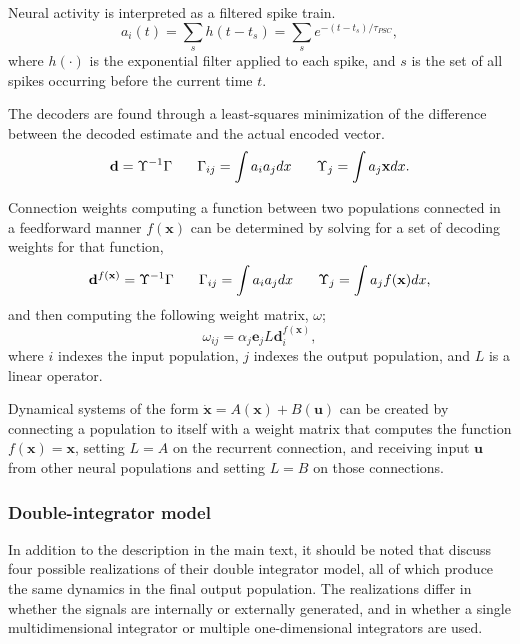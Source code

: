 \documentclass[11pt]{article}
\begin{document}
Neural activity is interpreted as a
filtered spike train.
\begin{equation}
  a_i(t) = \sum_s h(t - t_s) = \sum_s e^{-(t - t_s) / \tau_{PSC}},
\end{equation}
where $h(\cdot)$ is the exponential filter
applied to each spike,
and $s$ is the set of all spikes occurring
before the current time $t$.

The decoders are found through a least-squares minimization
of the difference between the decoded estimate
and the actual encoded vector.
\begin{equation}
  \mathbf{d} = \Upsilon^{-1} \Gamma \hspace{1.8em}
  \Gamma_{ij} = \int a_i a_j dx \hspace{1.8em}
  \Upsilon_j = \int a_j \mathbf{x} dx.
\end{equation}

Connection weights computing a function
between two populations connected in a feedforward manner
$f(\mathbf{x})$ can be determined by
solving for a set of decoding weights
for that function,
\begin{equation}
  \mathbf{d}^{f(\mathbf{x})} = \Upsilon^{-1} \Gamma \hspace{1.8em}
  \Gamma_{ij} = \int a_i a_j dx \hspace{1.8em}
  \Upsilon_j = \int a_j f(\mathbf{x}) dx,
\end{equation}
and then computing the following weight matrix, $\omega$;
\begin{equation}
	\omega_{ij} = \alpha_j \mathbf{e}_j L \mathbf{d}^{f(\mathbf{x})}_i,
\end{equation}
where $i$ indexes the input population,
$j$ indexes the output population,
and $L$ is a linear operator.

Dynamical systems of the form
$\dot{\mathbf{x}} = A(\mathbf{x}) + B(\mathbf{u})$
can be created by connecting a population
to itself with a weight matrix
that computes the function $f(\mathbf{x}) = \mathbf{x}$,
setting $L = A$ on the recurrent connection,
and receiving input $\mathbf{u}$
from other neural populations
and setting $L = B$ on those connections.

\subsubsection{Double-integrator model}

In addition to the description in the main text,
it should be noted that \citeauthor{Singh2006}
discuss four possible
realizations of their double integrator model,
all of which produce the same dynamics
in the final output population.
The realizations differ in whether
the signals are internally or externally generated,
and in whether a single multidimensional integrator
or multiple one-dimensional integrators are used.
\end{document}
